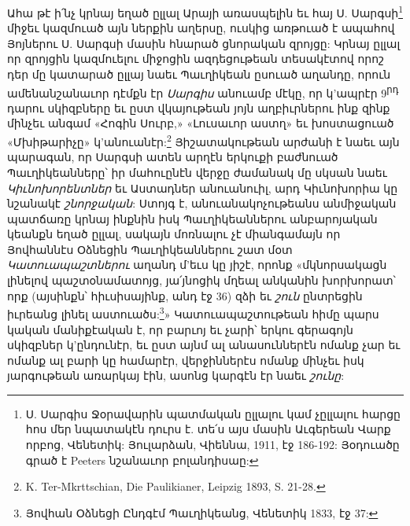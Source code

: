 \documentclass{article}
\begin{document}
{Ահա թէ ի՛նչ կրնայ եղած ըլլալ Արայի առասպելին եւ հայ Ս. Սարգսի\footnote{Ս. Սարգիս Ջօրավարին պատմական ըլլալու կամ չըլլալու հարցը հոս մեր նպատակէն դուրս է. տե՛ս այս մասին Աւգերեան Վարք որբոց, Վենետիկ: Յուլարձան, Վիեննա, 1911, էջ 186-192: Յօդուածը գրած է Peeters նշանաւոր բոլանդիսաը:} միջեւ կազմուած այն ներքին աղերսը, ուսկից առթուած է ապահով Յոյներու Ս. Սարգսի մասին հնարած ցնորական զրոյցը: Կրնայ ըլլալ որ զրոյցին կազմուելու միջոցին ազդեցութեան տեսակէտով որոշ դեր մը կատարած ըլլայ նաեւ Պաւղիկեան ըսուած աղանդը, որուն ամենանշանաւոր դէմքն էր \emph{Սարգիս} անուամբ մէկը, որ կ'ապրէր 9\textsuperscript{րդ} դարու սկիզբները եւ ըստ վկայութեան յոյն աղբիւրներու ինք զինք մինչեւ անգամ «Հոգին Սուրբ,» «Լուսաւոր աստղ» եւ խոստացուած «Մխիթարիչը» կ'անուանէր:\footnote{K. Ter-Mkrttschian, Die Paulikianer, Leipzig 1893, S. 21-28.} Յիշատակութեան արժանի է նաեւ այն պարագան, որ Սարգսի ատեն արղէն երկուքի բաժնուած Պաւղիկեանները՝ իր մահուընէն վերջը ժամանակ մը սկսան նաեւ \emph{Կիւնոխորենտներ} եւ Աստադներ անուանուիլ, արդ Կիւնոխորիա կը նշանակէ \emph{շնորջական}: Ստոյգ է, անուանակոչութեանս անմիջական պատճառը կրնայ ինքնին իսկ Պաւղիկեաններու անբարոյական կեանքն եղած ըլլալ, սակայն մոռնալու չէ միանգամայն որ Յովհաննէս Օձնեցին Պաւղիկեաններու շատ մօտ \emph{Կատուապաշտներու} աղանդ մ'եւս կը յիշէ, որոնք «մկնորսակացն լինելով պաշտօնամատոյց, յա՛յնոցիկ մղեալ անկանին խորխորատ՝ որք (այսինքն՝ հիւսիսայինք, անդ էջ 36) զձի եւ \emph{շուն} ընտրեցին իւրեանց լինել աստուածս:\footnote{Յովհան Օձնեցի Ընդգէմ Պաւղիկեանց, Վենետիկ 1833, էջ 37:}» Կատուապաշտութեան հիմը պարս կական մանիքէական է, որ բարւոյ եւ չարի՝ երկու գերագոյն սկիզբներ կ'ընդունէր, եւ ըստ այնմ ալ անասուններէն ոմանք չար եւ ոմանք ալ բարի կը համարէր, վերջիններէս ոմանք մինչեւ իսկ յարգութեան առարկայ էին, ասոնց կարգէն էր նաեւ \emph{շունը}:

}
\end{document}
